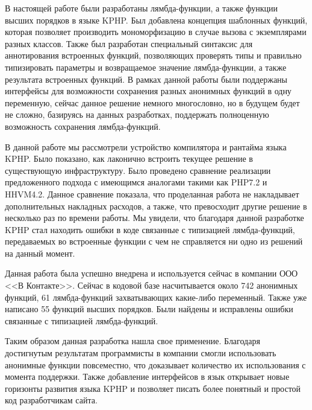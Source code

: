 
\startconclusionpage
В настоящей работе были разработаны лямбда-функции, а также функции высших порядков в языке KPHP.
Был добавлена концепция шаблонных функций, которая позволяет производить мономорфизацию в случае вызова с экземплярами разных классов.
Также был разработан специальный синтаксис для аннотирования встроенных функций, позволяющих проверять типы и правильно типизировать параметры и возвращаемое значение лямбда-функции, а также результата встроенных функций.
В рамках данной работы были поддержаны интерфейсы для возможности сохранения разных анонимных функций в одну переменную, сейчас данное решение немного многословно, но в будущем будет не сложно, базируясь на данных разработках, поддержать полноценную возможность сохранения лямбда-функций.

В данной работе мы рассмотрели устройство компилятора и рантайма языка KPHP.
Было показано, как лаконично встроить текущее решение в существующую инфраструктуру.
Было проведено сравнение реализации предложенного подхода с имеющимся аналогами такими как PHP7.2 и HHVM4.2.
Данное сравнение показала, что проделанная работа не накладывает дополнительных накладных расходов, а также, что превосходит другие решение в несколько раз по времени работы.
Мы увидели, что благодаря данной разработке KPHP стал находить ошибки в коде связанные с типизацией лямбда-функций, передаваемых во встроенные функции с чем не справляется ни одно из решений на данный момент.

Данная работа была успешно внедрена и используется сейчас в компании ООО <<В Контакте>>.
Сейчас в кодовой базе насчитывается около 742 анонимных функций, 61 лямбда-функций захватывающих какие-либо переменный.
Также уже написано 55 функций высших порядков.
Были найдены и исправлены ошибки связанные с типизацией лямбда-функций.

Таким образом данная разработка нашла свое применение.
Благодаря достигнутым результатам программисты в компании смогли использовать анонимные функции повсеместно, что доказывает количество их использования с момента поддержки.
Также добавление интерфейсов в язык открывает новые горизонты развития языка KPHP и позволяет писать более понятный и простой код разработчикам сайта.

\printmainbibliography
